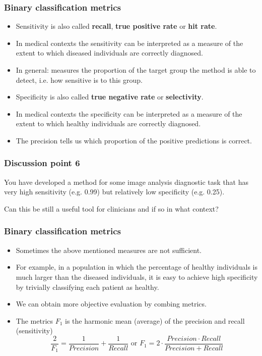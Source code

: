 \documentclass[notes]{beamer}          %
\begin{document}
\begin{frame}
\frametitle{Binary classification metrics}
    \begin{itemize}
        \item Sensitivity is also called {\bf recall}, {\bf true positive rate} or {\bf hit rate}.
        \item In medical contexts the sensitivity can be interpreted as a measure of the extent to which diseased individuals are correctly diagnosed.
        \item In general: measures the proportion of the target group the method is able to detect, i.e. how sensitive is to this group.
        \item Specificity is also called {\bf true negative rate} or {\bf selectivity}.
        \item In medical contexts the specificity can be interpreted as a measure of the extent to which healthy individuals are correctly diagnosed.
        \item The precision tells us which proportion of the positive predictions is correct.
    \end{itemize}
\end{frame}

\begin{frame}
\frametitle{Discussion point 6}
You have developed a method for some image analysis diagnostic task that has very high sensitivity (e.g. 0.99) but relatively low specificity (e.g. 0.25). 

Can this be still a useful tool for clinicians and if so in what context? \end{frame}

\begin{frame}
\frametitle{Binary classification metrics}
    \begin{itemize}
        \item Sometimes the above mentioned measures are not sufficient.
        \item For example, in a population in which the percentage of healthy individuals is much larger than the diseased individuals, it is easy to achieve high specificity by trivially classifying each patient as healthy.
        \item We can obtain more objective evaluation by combing metrics.
        \item The metrics $F_1$ is the harmonic mean (average) of the precision and recall (sensitivity)
        $$
        \frac{2}{F_1} = \frac{1}{Precision}+\frac{1}{Recall} \text{  or  } F_1 = 2 \cdot \frac{Precision \cdot Recall}{Precision+Recall}
        $$
    \end{itemize}
\end{frame}
\end{document}
